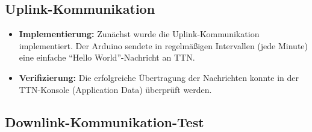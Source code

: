 \documentclass[12pt,a4paper]{article}
\begin{document}
\subsection{Uplink-Kommunikation}

\begin{itemize}
    \item \textbf{Implementierung:} Zunächst wurde die Uplink-Kommunikation implementiert. Der Arduino sendete in regelmäßigen Intervallen (jede Minute) eine einfache ``Hello World''-Nachricht an TTN.
    \item \textbf{Verifizierung:} Die erfolgreiche Übertragung der Nachrichten konnte in der TTN-Konsole (Application Data) überprüft werden.
\end{itemize}

\subsection{Downlink-Kommunikation-Test}
\end{document}
